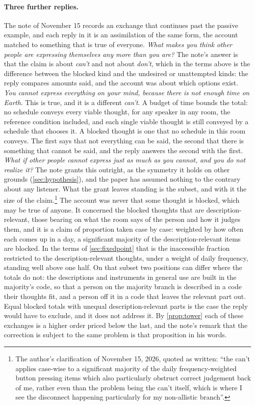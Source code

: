 \paragraph{Three further replies.} The note of November 15 records an exchange that continues past the passive example, and each reply in it is an assimilation of the same form, the account matched to something that is true of everyone. \emph{What makes you think other people are expressing themselves any more than you are?} The note's answer is that the claim is about \emph{can't} and not about \emph{don't}, which in the terms above is the difference between the blocked kind and the undesired or unattempted kinds: the reply compares amounts said, and the account was about which options exist. \emph{You cannot express everything on your mind, because there is not enough time on Earth.} This is true, and it is a different \emph{can't}. A budget of time bounds the total: no schedule conveys every viable thought, for any speaker in any room, the reference condition included, and each single viable thought is still conveyed by a schedule that chooses it. A blocked thought is one that no schedule in this room conveys. The first says that not everything can be said, the second that there is something that cannot be said, and the reply answers the second with the first. \emph{What if other people cannot express just as much as you cannot, and you do not realize it?} The note grants this outright, as the symmetry it holds on other grounds (\autoref{sec:hypothesis}), and the paper has assumed nothing to the contrary about any listener. What the grant leaves standing is the subset, and with it the size of the claim.\footnote{The author's clarification of November 15, 2026, quoted as written: ``the can't applies case-wise to a significant majority of the daily frequency-weighted button pressing items which also particularly obstruct correct judgement back of me, rather even than the problem being the can't itself, which is where I see the disconnect happening particularly for my non-allistic branch''.} The account was never that some thought is blocked, which may be true of anyone. It concerned the blocked thoughts that are description-relevant, those bearing on what the room says of the person and how it judges them, and it is a claim of proportion taken case by case: weighted by how often each comes up in a day, a significant majority of the description-relevant items are blocked. In the terms of \autoref{sec:fixedpoint} that is the inaccessible fraction restricted to the description-relevant thoughts, under a weight of daily frequency, standing well above one half. On that subset two positions can differ where the totals do not: the descriptions and instruments in general use are built in the majority's code, so that a person on the majority branch is described in a code their thoughts fit, and a person off it in a code that leaves the relevant part out. Equal blocked totals with unequal description-relevant parts is the case the reply would have to exclude, and it does not address it. By \autoref{prop:tower} each of these exchanges is a higher order priced below the last, and the note's remark that the correction is subject to the same problem is that proposition in his words. 